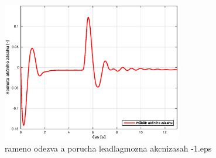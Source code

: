 \documentclass[11pt,a4paper]{article}
\begin{document}
\begin{figure}[H]
\centering
\includegraphics[width=0.7\textwidth]{dobre_grafy/rameno_odezva_a_porucha_leadlagmozna_akcnizasah_-1.eps}
\caption{rameno odezva a porucha leadlagmozna akcnizasah -1.eps}
\label{ram_ob1_akc}
\end{figure}
\end{document}
